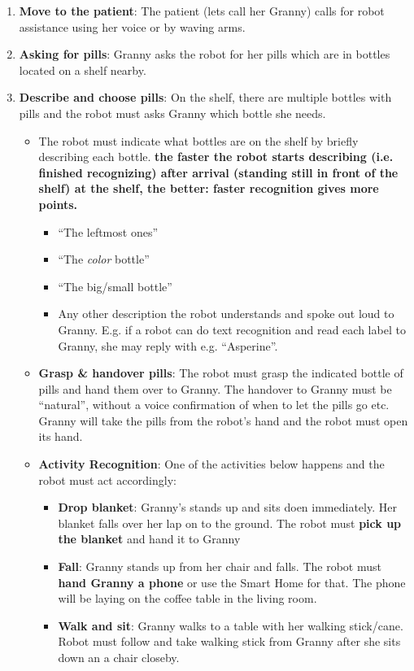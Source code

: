 \begin{enumerate}
	\item \textbf{Move to the patient}: The patient (lets call her Granny) calls for robot assistance using her voice or by waving arms.
	\item \textbf{Asking for pills}: Granny asks the robot for her pills which are in bottles located on a shelf nearby. 
	\item \textbf{Describe and choose pills}: On the shelf, there are multiple bottles with pills and the robot must asks Granny which bottle she needs.
	\begin{itemize}
		\item The robot must indicate what bottles are on the shelf by briefly describing each bottle.
		\textbf{the faster the robot starts describing (i.e. finished recognizing) after arrival (standing still in front of the shelf) at the shelf, the better: faster recognition gives more points. }
		\begin{itemize}
 			\item ``The leftmost ones''
  			\item ``The \textit{color} bottle''
  			\item ``The big/small bottle''
  			\item Any other description the robot understands and spoke out loud to Granny. E.g. if a robot can do text recognition and read each label to Granny, she may reply with e.g. ``Asperine''.
 		\end{itemize}
 	\item \textbf{Grasp \& handover pills}: The robot must grasp the indicated bottle of pills and hand them over to Granny. The handover to Granny must be ``natural'', without a voice confirmation of when to let the pills go etc. Granny will take the pills from the robot's hand and the robot must open its hand.
 	\item \textbf{Activity Recognition}: One of the activities below happens and the robot must act accordingly:
 	\begin{itemize}
 		\item \textbf{Drop blanket}: Granny's stands up and sits doen immediately. Her blanket falls over her lap on to the ground. The robot must \textbf{pick up the blanket} and hand it to Granny
 		\item \textbf{Fall}: Granny stands up from her chair and falls. The robot must \textbf{hand Granny a phone} or use the Smart Home for that. 
								The phone will be laying on the coffee table in the living room.
 		\item \textbf{Walk and sit}: Granny walks to a table with her walking stick/cane. Robot must follow and take walking stick from Granny after she sits down an a chair closeby.
 	\end{itemize}
\end{itemize}


\end{enumerate}
